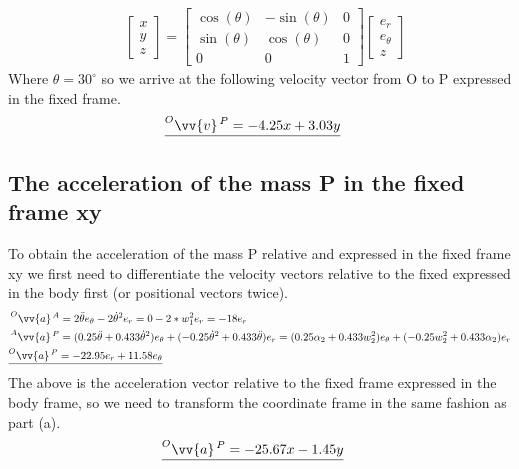 \documentclass{article}
\begin{document}
\begin{align*}
    & \begin{bmatrix} x \\ y \\ z \end{bmatrix} = \begin{bmatrix} \cos(\theta) & -\sin(\theta) & 0 \\ \sin(\theta) & \cos(\theta) & 0 \\ 0 & 0 & 1 \end{bmatrix} \begin{bmatrix} e_r \\ e_{\theta} \\ z \end{bmatrix}
\end{align*}
Where $\theta = 30^\circ$ so we arrive at the following velocity vector from O to P expressed in the fixed frame.
\begin{align*}
    & \underline{\prescript{O}{}{\vv{v}}^{\, P} = -4.25 x + 3.03 y}
\end{align*}

\subsection{The acceleration of the mass P in the fixed frame xy}

To obtain the acceleration of the mass P relative and expressed in the fixed frame xy we first need to differentiate the velocity vectors relative to the fixed expressed in the body first (or positional vectors twice).
\begin{align*}
    & \prescript{O}{}{\vv{a}}^{\, A} = 2 \ddot{\theta} e_{\theta} - 2 \dot{\theta}^2 e_r = 0 - 2 * w_1^2 e_r = -18 e_r \\
    & \prescript{A}{}{\vv{a}}^{\, P} =  (0.25 \ddot{\theta} + 0.433 \dot{\theta}^2) e_{\theta} + (-0.25 \dot{\theta}^2 + 0.433 \ddot{\theta}) e_r = (0.25 \alpha_2 + 0.433 w_2^2) e_{\theta} + (-0.25 w_2^2 + 0.433 \alpha_2) e_r \\
    & \underline{\prescript{O}{}{\vv{a}}^{\, P} = -22.95e_r + 11.58e_{\theta}}
\end{align*}
The above is the acceleration vector relative to the fixed frame expressed in the body frame, so we need to transform the coordinate frame in the same fashion as part (a).
\begin{align*}
    & \underline{\prescript{O}{}{\vv{a}}^{\, P} = -25.67x - 1.45y}
\end{align*}
\end{document}
